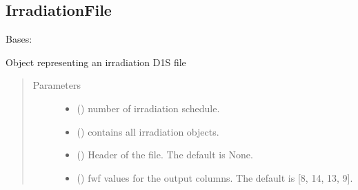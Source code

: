 \documentclass[letterpaper,10pt,english]{sphinxmanual}
\begin{document}
\subsection{IrradiationFile}
\label{\detokenize{api/inputgeneration:irradiationfile}}\label{\detokenize{api/inputgeneration:irradfileob}}

\begin{fulllineitems}
\label{\detokenize{api/inputgeneration:parsersD1S.IrradiationFile}}
\sphinxAtStartPar
Bases: 

\sphinxAtStartPar
Object representing an irradiation D1S file
\begin{quote}\begin{description}
\item[{Parameters}] \leavevmode\begin{itemize}
\item {} 
\sphinxAtStartPar
{} () \textendash{} number of irradiation schedule.

\item {} 
\sphinxAtStartPar
{} () \textendash{} contains all irradiation objects.

\item {} 
\sphinxAtStartPar
{} (\sphinxstyleliteralemphasis{\sphinxupquote{, }}) \textendash{} Header of the file. The default is None.

\item {} 
\sphinxAtStartPar
{} (\sphinxstyleliteralemphasis{\sphinxupquote{, }}) \textendash{} fwf values for the output columns. The default is {[}8, 14, 13, 9{]}.


\end{itemize}
\end{description}
\end{quote}
\end{fulllineitems}
\end{document}

